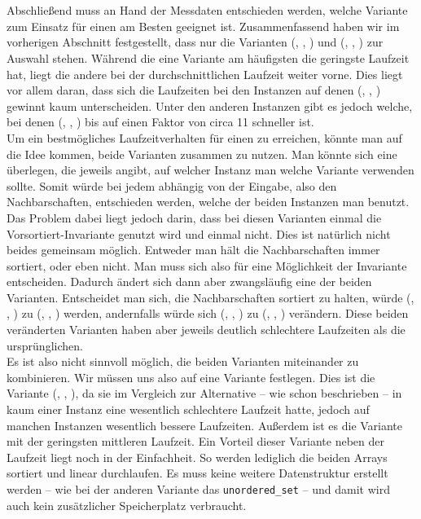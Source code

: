 \section{}
Abschließend muss an Hand der Messdaten entschieden werden, welche Variante zum Einsatz für
einen \ct{} am Besten geeignet ist.
Zusammenfassend haben wir im vorherigen Abschnitt festgestellt, 
dass nur die Varianten (\SorSor, \true, \distr) und (\SeaUSet, \false, \perm) zur Auswahl stehen.
Während die eine Variante am häufigsten die geringste Laufzeit hat, liegt die andere 
bei der durchschnittlichen Laufzeit weiter vorne. Dies liegt vor allem daran, dass sich 
die Laufzeiten bei den Instanzen auf denen (\SeaUSet, \false, \perm) \glqq gewinnt\grqq{} kaum unterscheiden.
Unter den anderen Instanzen gibt es jedoch welche, bei denen (\SorSor, \true, \distr) bis auf einen
Faktor von circa 11 schneller ist.
\\
Um ein bestmögliches Laufzeitverhalten für einen \ct{} zu erreichen, könnte man auf die Idee kommen, 
beide Varianten zusammen zu nutzen. Man könnte sich eine  überlegen, die jeweils angibt, 
auf welcher Instanz man welche Variante verwenden sollte. Somit würde bei jedem \ct{} abhängig von 
der Eingabe, also den Nachbarschaften, entschieden werden, welche der beiden Instanzen man benutzt. 
Das Problem dabei liegt jedoch darin, dass bei diesen Varianten einmal die Vorsortiert-Invariante
genutzt wird und einmal nicht. Dies ist natürlich nicht beides gemeinsam möglich. Entweder man hält die
Nachbarschaften immer sortiert, oder eben nicht. Man muss sich also für eine Möglichkeit der
Invariante entscheiden. Dadurch ändert sich dann aber zwangsläufig  eine der beiden Varianten. 
Entscheidet man sich, die Nachbarschaften sortiert zu halten, würde (\SeaUSet, \false, \perm) zu (\SeaUSet, \true, \perm){}
werden, andernfalls würde sich (\SorSor, \true, \distr) zu (\SorSor, \false, \distr) verändern.
Diese beiden \glqq veränderten \grqq{} Varianten haben aber jeweils deutlich schlechtere Laufzeiten
als die ursprünglichen.
\\
Es ist also nicht sinnvoll möglich, die beiden Varianten miteinander zu kombinieren. Wir müssen uns
also auf eine Variante festlegen. Dies ist die Variante (\SorSor, \true, \distr), da sie im Vergleich zur
Alternative -- wie schon beschrieben --
in kaum einer Instanz eine wesentlich schlechtere Laufzeit hatte, jedoch auf manchen Instanzen wesentlich
bessere Laufzeiten. Außerdem ist es die Variante mit der geringsten mittleren Laufzeit. 
Ein Vorteil dieser Variante neben der Laufzeit liegt noch in der Einfachheit. So werden
lediglich die beiden Arrays sortiert und linear durchlaufen. Es muss keine weitere Datenstruktur
erstellt werden -- wie bei der anderen Variante das \texttt{unordered\_set} -- und damit wird
auch kein zusätzlicher Speicherplatz verbraucht.



\section{}
